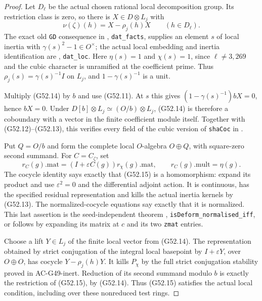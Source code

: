 \begin{proof}
Let $D_\ell$ be the actual chosen rational local
decomposition group.  Its restriction class is zero,
so there is $X\in D\otimes L_j$ with
\[
                  \nu(\zeta)(h)=X-\rho_j(h)X
                                      \qquad(h\in D_\ell).
                                                               \tag{G52.14}
\]
The exact old \texttt{GD} consequence in
,
\texttt{dat\_facts}, supplies an element $s$ of local
inertia with $\gamma(s)^2-1\in O^\times$; the actual
local embedding and inertia identification are
, \texttt{dat\_loc}.
Here $\eta(s)=1$ and $\chi(s)=1$, since
$\ell\ne3,269$ and the cubic character is unramified
at the coefficient prime.
Thus $\rho_j(s)=\gamma(s)^{-1}I$ on $L_j$, and
$1-\gamma(s)^{-1}$ is a unit.

Multiply (G52.14) by $b$ and use (G52.11).
At $s$ this gives
$(1-\gamma(s)^{-1})bX=0$, hence $bX=0$.
Under $D[b]\otimes L_j\simeq(O/b)\otimes L_j$,
(G52.14) is therefore a coboundary with a vector in
the finite coefficient module itself.
Together with (G52.12)--(G52.13), this verifies every
field of the cubic version of \texttt{shaCoc} in
.

Put $Q=O/b$ and form the complete local $O$-algebra
$O\oplus Q$, with square-zero second summand.
For $C=C_\zeta$, set
\[
 r_C(g).\mathrm{mat}
      =(I+\varepsilon C(g))r_\chi(g).\mathrm{mat},
             \qquad r_C(g).\mathrm{mult}=\eta(g).             \tag{G52.15}
\]
The cocycle identity says exactly that (G52.15) is a
homomorphism: expand its product and use
$\varepsilon^2=0$ and the differential adjoint action.
It is continuous, has the specified residual
representation and kills the actual inertia kernels
by (G52.13).
The normalized-cocycle equations say exactly that
it is normalized.  This last assertion is the
seed-independent theorem
,
\texttt{isDeform\_normalised\_iff}, or follows by
expanding its matrix at $c$ and its two \texttt{zmat}
entries.

Choose a lift $Y\in L_j$ of the finite local vector
from (G52.14).  The representation obtained by
strict conjugation of the integral local basepoint
by $I+\varepsilon Y$, over $O\oplus O$, has cocycle
$Y-\rho_j(h)Y$.
It kills $P_\chi$ by the full strict conjugation
stability proved in AC-G49-inert.
Reduction of its second summand modulo $b$ is exactly
the restriction of (G52.15), by (G52.14).
Thus (G52.15) satisfies the actual local condition,
including over these nonreduced test rings.


\end{proof}
